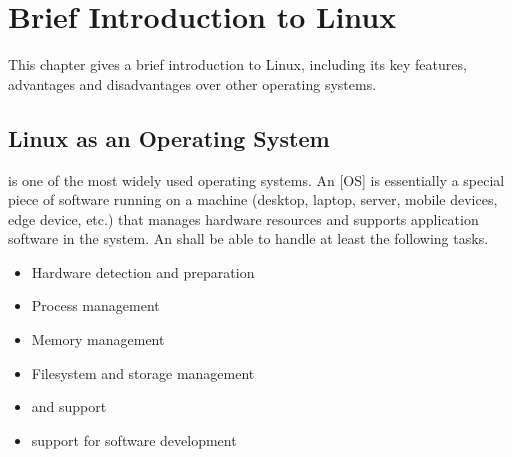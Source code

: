 \chapter{Brief Introduction to Linux}

This chapter gives a brief introduction to Linux, including its key features, advantages and disadvantages over other operating systems.

\section{Linux as an Operating System}
 is one of the most widely used operating systems. An [OS] is essentially a special piece of software running on a machine (desktop, laptop, server, mobile devices, edge device, etc.) that manages hardware resources and supports application software in the system. An  shall be able to handle at least the following tasks.
\begin{itemize}
  \item Hardware detection and preparation
  \item Process management
  \item Memory management
  \item Filesystem and storage management
  \item {} and  support
  \item {} support for software development
\end{itemize}

